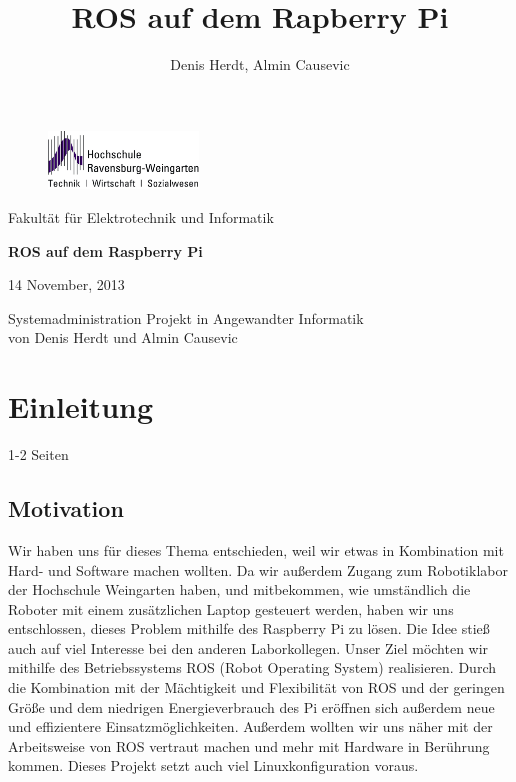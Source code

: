 \documentclass[12pt]{article}
\author{Denis Herdt, Almin Causevic}
\title{ROS auf dem Rapberry Pi}
\begin{document}
\begin{figure}[h]

\includegraphics[width=4cm]{hs-logo.jpg}
\end{figure}
Fakultät für Elektrotechnik und Informatik

\vspace{3cm}

\begin{center}

{\bf \huge ROS auf dem Raspberry Pi}
\vspace{4cm}

14 November, 2013
\vspace{1cm}

Systemadministration Projekt in Angewandter Informatik \\
von Denis Herdt und Almin Causevic

\end{center}

\pagebreak

\tableofcontents

\pagebreak

\section{Einleitung}
1-2 Seiten
\subsection{Motivation}

Wir haben uns für dieses Thema entschieden, weil wir etwas in Kombination mit Hard- und Software machen wollten. Da wir außerdem Zugang zum Robotiklabor der Hochschule
Weingarten haben, und mitbekommen, wie umständlich 
die Roboter mit einem zusätzlichen Laptop gesteuert werden, haben wir uns entschlossen, dieses Problem mithilfe des Raspberry Pi zu lösen. Die Idee stieß auch auf viel Interesse bei den anderen Laborkollegen.
Unser Ziel möchten wir mithilfe des Betriebssystems ROS (Robot Operating System) realisieren.
Durch die Kombination mit der Mächtigkeit und Flexibilität von ROS und der geringen Größe und dem niedrigen Energieverbrauch des Pi eröffnen sich außerdem neue und effizientere Einsatzmöglichkeiten.
Außerdem wollten wir uns näher mit der Arbeitsweise von ROS vertraut machen und mehr mit Hardware in Berührung kommen. 
Dieses Projekt setzt auch viel Linuxkonfiguration voraus.
\end{document}
